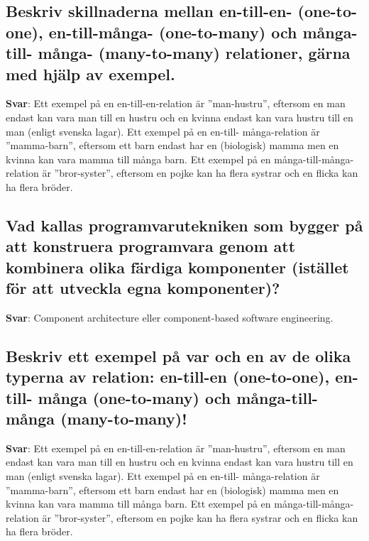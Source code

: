 \documentclass[a4paper,11pt,oneside]{article}
\begin{document}
\begin{sloppypar}
\subsection{Beskriv skillnaderna mellan en-till-en- (one-to-one), en-till-m\r{a}nga- (one-to-many) och m\r{a}nga-till- m\r{a}nga- (many-to-many) relationer, g\"arna med hj\"alp av exempel.}

\label{q:230:sa:sv:True}

\textbf{Svar}: Ett exempel p\r{a} en en-till-en-relation \"ar {\textquotedblright}man-hustru{\textquotedblright}, eftersom en man endast kan vara man till en hustru och en kvinna endast kan vara hustru till en man (enligt svenska lagar). Ett exempel p\r{a} en en-till- m\r{a}nga-relation \"ar {\textquotedblright}mamma-barn{\textquotedblright}, eftersom ett barn endast har en (biologisk) mamma men en kvinna kan vara mamma till m\r{a}nga barn. Ett exempel p\r{a} en m\r{a}nga-till-m\r{a}nga-relation \"ar {\textquotedblright}bror-syster{\textquotedblright}, eftersom en pojke kan ha flera systrar och en flicka kan ha flera br\"oder.



\subsection{Vad kallas programvarutekniken som bygger p\r{a} att konstruera programvara genom att kombinera olika f\"ardiga komponenter (ist\"allet f\"or att utveckla egna komponenter)?}

\label{q:231:sa:sv:True}

\textbf{Svar}: Component architecture eller component-based software engineering.



\subsection{Beskriv ett exempel p\r{a} var och en av de olika typerna av relation: en-till-en (one-to-one), en-till- m\r{a}nga (one-to-many) och m\r{a}nga-till-m\r{a}nga (many-to-many)!}

\label{q:232:sa:sv:True}

\textbf{Svar}: Ett exempel p\r{a} en en-till-en-relation \"ar {\textquotedblright}man-hustru{\textquotedblright}, eftersom en man endast kan vara man till en hustru och en kvinna endast kan vara hustru till en man (enligt svenska lagar). Ett exempel p\r{a} en en-till- m\r{a}nga-relation \"ar {\textquotedblright}mamma-barn{\textquotedblright}, eftersom ett barn endast har en (biologisk) mamma men en kvinna kan vara mamma till m\r{a}nga barn. Ett exempel p\r{a} en m\r{a}nga-till-m\r{a}nga-relation \"ar {\textquotedblright}bror-syster{\textquotedblright}, eftersom en pojke kan ha flera systrar och en flicka kan ha flera br\"oder.




\end{sloppypar}
\end{document}
